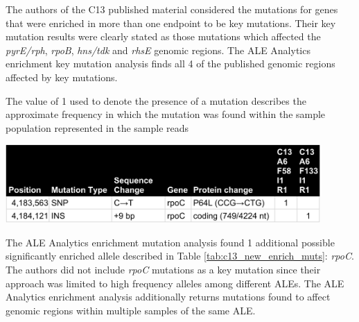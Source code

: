 \documentclass[12pt,final,masters,chapterheads]{ucsd}  %
\begin{document}
The authors of the C13 published material considered the mutations for genes that were enriched in more than one endpoint to be key mutations. Their key mutation results were clearly stated as those mutations which affected the \textit{pyrE/rph}, \textit{rpoB}, \textit{hns/tdk} and \textit{rhsE} genomic regions. The ALE Analytics enrichment key mutation analysis finds all 4 of the published genomic regions affected by key mutations.
\begin{table}[H]
  \centering
  \caption[New C13 ALE experiment enrichment key mutations.]{ The value of 1 used to denote the presence of a mutation describes the approximate frequency in which the mutation was found within the sample population represented in the sample reads \cite{breseq_paper}}
  \includegraphics[width=0.9\textwidth]{c13_new_enrich_muts.png}
  \label{tab:c13_new_enrich_muts}
\end{table}
The ALE Analytics enrichment mutation analysis found 1 additional possible significantly enriched allele described in Table \ref{tab:c13_new_enrich_muts}: \textit{rpoC}. The authors did not include \textit{rpoC} mutations as a key mutation since their approach was limited to high frequency alleles among different ALEs. The ALE Analytics enrichment analysis additionally returns mutations found to affect genomic regions within multiple samples of the same ALE.
\end{document}
